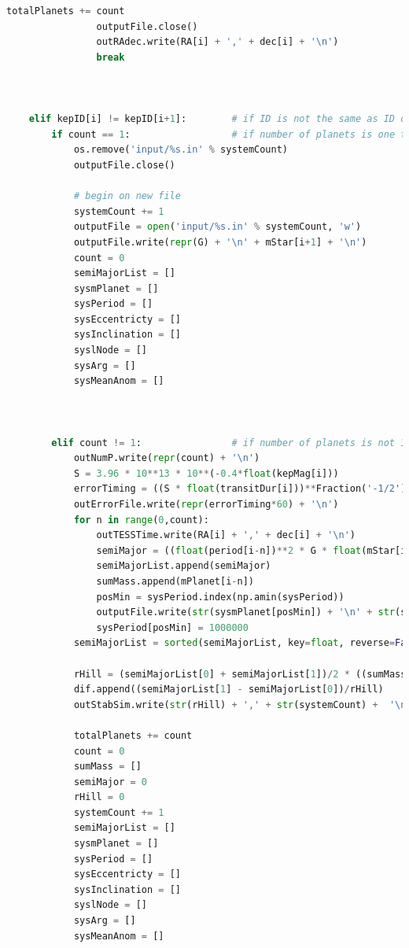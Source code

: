 \documentclass[12pt]{report}
\begin{document}
\begin{appendix}
\begin{lstlisting}[language=Python]
				totalPlanets += count	
				outputFile.close()
				outRAdec.write(RA[i] + ',' + dec[i] + '\n')
				break

			

	elif kepID[i] != kepID[i+1]:		# if ID is not the same as ID of next planet a new file is created for new system
		if count == 1:					# if number of planets is one the file is removed
			os.remove('input/%s.in' % systemCount)
			outputFile.close()

			# begin on new file
			systemCount += 1
			outputFile = open('input/%s.in' % systemCount, 'w')
			outputFile.write(repr(G) + '\n' + mStar[i+1] + '\n')
			count = 0
			semiMajorList = []
			sysmPlanet = []
			sysPeriod = []
			sysEccentricty = []
			sysInclination = []
			syslNode = []
			sysArg = []
			sysMeanAnom = []
			
			
			
		elif count != 1:				# if number of planets is not 1 the rest of the data is saved and a new file is created
			outNumP.write(repr(count) + '\n')
			S = 3.96 * 10**13 * 10**(-0.4*float(kepMag[i]))			
			errorTiming = ((S * float(transitDur[i]))**Fraction('-1/2') * ((float(rPlanet[i])*0.009158)/float(rStar[i]))**Fraction('-3/2') * float(transitDur[i]))		# timing precision in hours
			outErrorFile.write(repr(errorTiming*60) + '\n') 	
			for n in range(0,count):
				outTESSTime.write(RA[i] + ',' + dec[i] + '\n')
				semiMajor = ((float(period[i-n])**2 * G * float(mStar[i]))/(4 * math.pi**2))**Fraction('1/3')
				semiMajorList.append(semiMajor)
				sumMass.append(mPlanet[i-n])	
				posMin = sysPeriod.index(np.amin(sysPeriod))
				outputFile.write(str(sysmPlanet[posMin]) + '\n' + str(sysPeriod[posMin]) + ' ' + repr(sysEccentricty[posMin]) + ' ' + repr(sysInclination[posMin]) + ' ' + repr(syslNode[posMin]) + '  ' + repr(sysArg[posMin]) + ' ' + repr(sysMeanAnom[posMin]) + '\n')
				sysPeriod[posMin] = 1000000
			semiMajorList = sorted(semiMajorList, key=float, reverse=False)
			
			rHill = (semiMajorList[0] + semiMajorList[1])/2 * ((sumMass[0] + sumMass[1])/(3*float(mStar[i]))**Fraction('1/3'))
			dif.append((semiMajorList[1] - semiMajorList[0])/rHill)
			outStabSim.write(str(rHill) + ',' + str(systemCount) +  '\n')
			
			totalPlanets += count	
			count = 0
			sumMass = []
			semiMajor = 0
			rHill = 0
			systemCount += 1
			semiMajorList = []
			sysmPlanet = []
			sysPeriod = []
			sysEccentricty = []
			sysInclination = []
			syslNode = []
			sysArg = []
			sysMeanAnom = []
			

\end{lstlisting}
\end{appendix}
\end{document}
